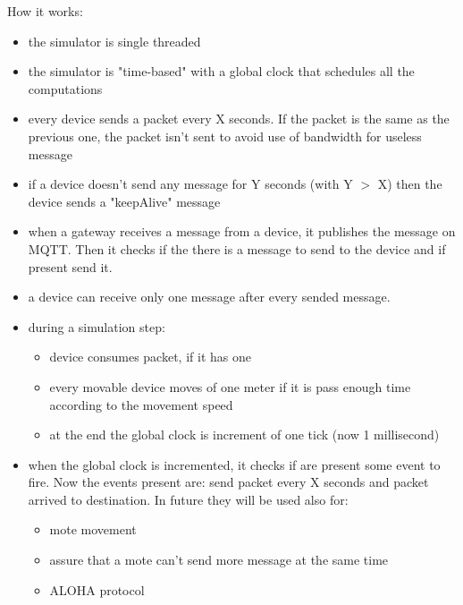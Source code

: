 How it works:
\begin{itemize}
    \item the simulator is single threaded
    \item the simulator is "time-based" with a global clock that schedules all the computations
    \item every device sends a packet every X seconds. If the packet is the same as the previous one, the packet isn't sent to avoid use of bandwidth for useless message
    \item if a device doesn't send any message for Y seconds (with Y $>$ X) then the device sends a "keepAlive" message
    \item when a gateway receives a message from a device, it publishes the message on MQTT. Then it checks if the there is a message to send to the device and if present send it.
    \item a device can receive only one message after every sended message.
    \item during a simulation step:
    \begin{itemize}
        \item device consumes packet, if it has one
        \item every movable device moves of one meter if it is pass enough time according to the movement speed
        \item at the end the global clock is increment of one tick (now 1 millisecond)
    \end{itemize}
    \item when the global clock is incremented, it checks if are present some event to fire. Now the events present are: send packet every X seconds and packet arrived to destination. In future they will be used also for:
    \begin{itemize}
        \item mote movement
        \item assure that a mote can't send more message at the same time
        \item ALOHA protocol
    \end{itemize}
\end{itemize}